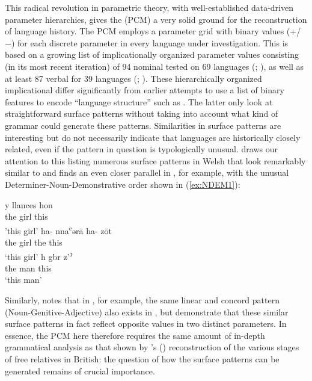 \documentclass[output=paper,colorlinks,citecolor=brown]{langscibook}
\begin{document}
This radical revolution in parametric theory, with well-established data-driven parameter hierarchies, gives the  (PCM) a very solid ground for the reconstruction of language history. The PCM employs a parameter grid with binary values (+/−) for each discrete parameter in every language under investigation. This is based on a growing list of implicationally organized parameter values consisting (in its most recent iteration) of 94 nominal  tested on 69 languages (\citealt{mm:longobardi_principles_2017}; \citealt{mm:ceolin_formal_2020}), as well as at least 87 verbal  for 39 languages (\citealt{mm:robertsbakermeelenetal2022}; \citealt{mm:bakerroberts2024}). These hierarchically organized implicational  differ significantly from earlier attempts to use a list of binary features to encode “language structure” such as \citet{mm:nichols_linguistic_1992, mm:ringe_indo-european_2002, mm:dunn2005structural}. The latter only look at straightforward surface patterns without taking into account what kind of grammar could generate these patterns. Similarities in surface patterns are interesting but do not necessarily indicate that languages are historically closely related, even if the pattern in question is typologically unusual. \citet{mm:jongeling_comparing_2000} draws our attention to this listing numerous surface patterns in Welsh that look remarkably similar to  and finds an even closer parallel in , for example, with the unusual Determiner-Noun-Demonstrative order shown in (\ref{ex:NDEM1}):

\ea 
\ea
\settowidth{}
\gll y llances hon \\
the girl this\\ \jambox{[Welsh]}
\glt 'this girl'
\ex
\gll ha- nna\textsuperscript{c}ər\=a ha- z\=ot \\
the girl the this \\ 
\glt `this girl' 
\ex
\gll h gbr z'\textsuperscript{ɔ}  \\
the man this\\ \jambox{[Phoenician]}
\glt `this man' 
\z
\label{ex:NDEM1}
\z

\noindent Similarly, \citet{mm:roberts_review_1998}  notes that in , for example, the same linear and concord pattern (Noun-Genitive-Adjective) also exists in , but \citet{mm:longobardi_toward_2013} demonstrate that these similar surface patterns in fact reflect opposite values in two distinct parameters. In essence, the PCM here therefore requires the same amount of in-depth grammatical analysis as that shown by \citeauthor{mm:willis_reconstructing_2011}'s (\citeyear{mm:willis_reconstructing_2011}) reconstruction of the various stages of free relatives in British: the question of how the surface patterns can be generated remains of crucial importance. 
\end{document}
